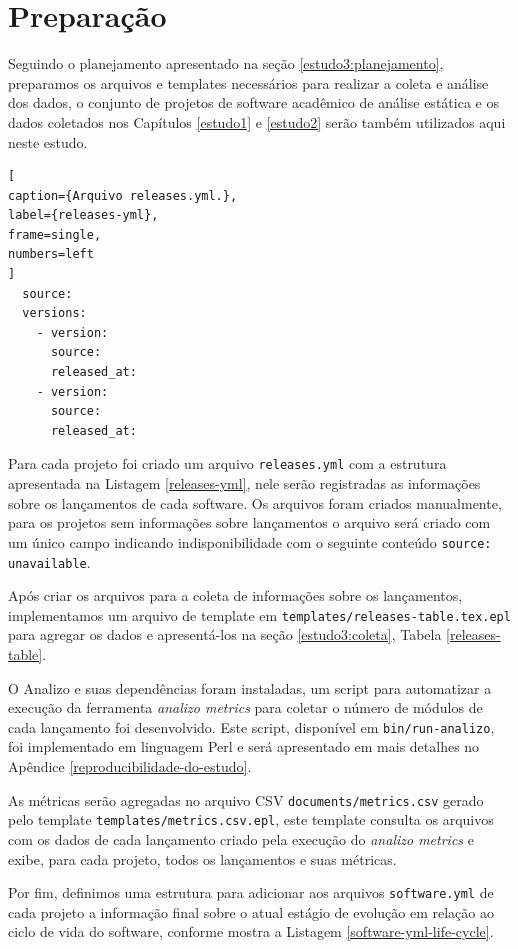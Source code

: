 
\section{Preparação} \label{estudo3:preparacao} %

Seguindo o planejamento apresentado na seção \ref{estudo3:planejamento},
preparamos os arquivos e templates necessários para realizar a coleta e análise
dos dados, o conjunto de projetos de software acadêmico de análise estática e
os dados coletados nos Capítulos \ref{estudo1} e \ref{estudo2} serão também
utilizados aqui neste estudo.

\begin{lstlisting}[
caption={Arquivo releases.yml.},
label={releases-yml},
frame=single,
numbers=left
]
  source:
  versions:
    - version:
      source:
      released_at:
    - version:
      source:
      released_at:
\end{lstlisting}

Para cada projeto foi criado um arquivo \texttt{releases.yml} com a estrutura
apresentada na Listagem \ref{releases-yml}, nele serão registradas as
informações sobre os lançamentos de cada software. Os arquivos foram criados
manualmente, para os projetos sem informações sobre lançamentos o arquivo será
criado com um único campo indicando indisponibilidade com o seguinte conteúdo
\texttt{source: unavailable}.

Após criar os arquivos para a coleta de informações sobre os lançamentos,
implementamos um arquivo de template em
\texttt{templates/releases-table.tex.epl} para agregar os dados e apresentá-los
na seção \ref{estudo3:coleta}, Tabela \ref{releases-table}.

O Analizo e suas dependências foram instaladas, um script para automatizar a
execução da ferramenta {\it analizo metrics} para coletar o número de módulos
de cada lançamento foi desenvolvido. Este script, disponível em
\texttt{bin/run-analizo}, foi implementado em linguagem Perl e será apresentado
em mais detalhes no Apêndice \ref{reproducibilidade-do-estudo}.

As métricas serão agregadas no arquivo CSV \texttt{documents/metrics.csv}
gerado pelo template \texttt{templates/metrics.csv.epl}, este template consulta
os arquivos com os dados de cada lançamento criado pela execução do {\it analizo metrics}
e exibe, para cada projeto, todos os lançamentos e suas métricas.

Por fim, definimos uma estrutura para adicionar aos arquivos \texttt{software.yml} de
cada projeto a informação final sobre o atual estágio de evolução em relação ao
ciclo de vida do software, conforme mostra a Listagem \ref{software-yml-life-cycle}.

